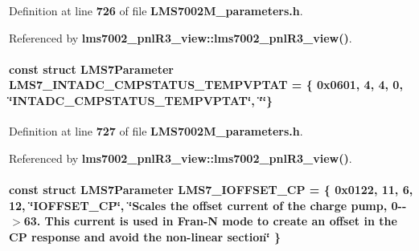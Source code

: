 Definition at line {\bf 726} of file {\bf L\+M\+S7002\+M\+\_\+parameters.\+h}.



Referenced by {\bf lms7002\+\_\+pnl\+R3\+\_\+view\+::lms7002\+\_\+pnl\+R3\+\_\+view()}.

\paragraph[{L\+M\+S7\+\_\+\+I\+N\+T\+A\+D\+C\+\_\+\+C\+M\+P\+S\+T\+A\+T\+U\+S\+\_\+\+T\+E\+M\+P\+V\+P\+T\+AT}]{\setlength{\rightskip}{0pt plus 5cm}const struct {\bf L\+M\+S7\+Parameter} L\+M\+S7\+\_\+\+I\+N\+T\+A\+D\+C\+\_\+\+C\+M\+P\+S\+T\+A\+T\+U\+S\+\_\+\+T\+E\+M\+P\+V\+P\+T\+AT = \{ 0x0601, 4, 4, 0, \char`\"{}\+I\+N\+T\+A\+D\+C\+\_\+\+C\+M\+P\+S\+T\+A\+T\+U\+S\+\_\+\+T\+E\+M\+P\+V\+P\+T\+A\+T\char`\"{}, \char`\"{}\char`\"{}\}\hspace{0.3cm}{\ttfamily [static]}}\label{LMS7002M__parameters_8h_a2e9d0031ccc364859e23f6775e17611c}


Definition at line {\bf 727} of file {\bf L\+M\+S7002\+M\+\_\+parameters.\+h}.



Referenced by {\bf lms7002\+\_\+pnl\+R3\+\_\+view\+::lms7002\+\_\+pnl\+R3\+\_\+view()}.

\paragraph[{L\+M\+S7\+\_\+\+I\+O\+F\+F\+S\+E\+T\+\_\+\+CP}]{\setlength{\rightskip}{0pt plus 5cm}const struct {\bf L\+M\+S7\+Parameter} L\+M\+S7\+\_\+\+I\+O\+F\+F\+S\+E\+T\+\_\+\+CP = \{ 0x0122, 11, 6, 12, \char`\"{}\+I\+O\+F\+F\+S\+E\+T\+\_\+\+C\+P\char`\"{}, \char`\"{}\+Scales the offset current of the charge pump, 0-\/-\/$>$63. This current is used in Fran-\/\+N mode to create an offset in the C\+P response and avoid the non-\/linear section\char`\"{} \}\hspace{0.3cm}{\ttfamily [static]}}\label{LMS7002M__parameters_8h_a389043d61f87107ad2fb692870f86195}


